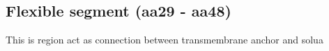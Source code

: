 \subsection{Flexible segment (aa29 - aa48)}

This is region act as connection between transmembrane anchor and solua
